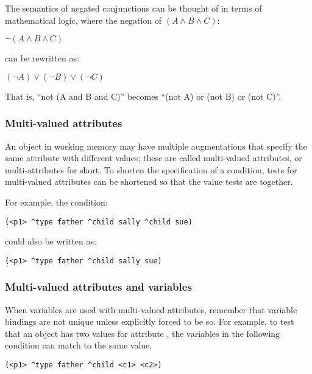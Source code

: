 The semantics of negated conjunctions can be thought of in terms of
mathematical logic, where the negation of $(A \wedge B \wedge C)$:

$\neg (A \wedge B \wedge C)$

can be rewritten as:

$(\neg A) \vee (\neg B) \vee (\neg C)$

That is, ``not (A and B and C)'' becomes ``(not A) or (not B) or (not C)''.



\subsubsection{Multi-valued attributes}
\label{SYNTAX-pm-multi}

An object in working memory may have multiple augmentations that specify
the same attribute with different values; these are called multi-valued
attributes, or multi-attributes for short.  To shorten the specification
of a condition, tests for multi-valued attributes can be shortened so
that the value tests are together.

For example, the condition:
\begin{verbatim}
(<p1> ^type father ^child sally ^child sue)
\end{verbatim}

could also be written as:
\begin{verbatim}
(<p1> ^type father ^child sally sue)
\end{verbatim}


\subsubsection*{Multi-valued attributes and variables}

When variables are used with multi-valued attributes, remember that
variable bindings are not unique unless explicitly forced to be so. For
example, to test that an object has two values for attribute
, the variables in the following condition can match to the same
value.

\begin{verbatim}
(<p1> ^type father ^child <c1> <c2>)
\end{verbatim} \vspace{12pt}

